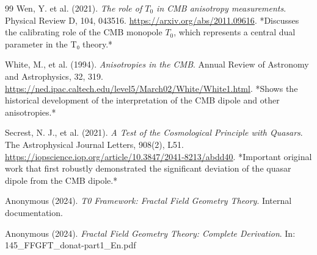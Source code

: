 \documentclass[12pt,a4paper]{article}
\begin{document}
\begin{thebibliography}{99}
		Wen, Y. et al. (2021). \textit{The role of \(T_0\) in CMB anisotropy measurements}. 
		Physical Review D, 104, 043516.
		\href{https://arxiv.org/abs/2011.09616}{https://arxiv.org/abs/2011.09616}.
		*Discusses the calibrating role of the CMB monopole \(T_0\), which represents a central dual parameter in the T₀ theory.*
		
		White, M., et al. (1994). \textit{Anisotropies in the CMB}. 
		Annual Review of Astronomy and Astrophysics, 32, 319.
		\href{https://ned.ipac.caltech.edu/level5/March02/White/White1.html}{https://ned.ipac.caltech.edu/level5/March02/White/White1.html}.
		*Shows the historical development of the interpretation of the CMB dipole and other anisotropies.*
		
		Secrest, N. J., et al. (2021). \textit{A Test of the Cosmological Principle with Quasars}. 
		The Astrophysical Journal Letters, 908(2), L51.
		\href{https://iopscience.iop.org/article/10.3847/2041-8213/abdd40}{https://iopscience.iop.org/article/10.3847/2041-8213/abdd40}.
		*Important original work that first robustly demonstrated the significant deviation of the quasar dipole from the CMB dipole.*
		
		Anonymous (2024). \textit{T0 Framework: Fractal Field Geometry Theory}. 
		Internal documentation.
		
		Anonymous (2024). \textit{Fractal Field Geometry Theory: Complete Derivation}. 
		In: 145\_FFGFT\_donat-part1\_En.pdf
		
	\end{thebibliography}
	
\end{document}
